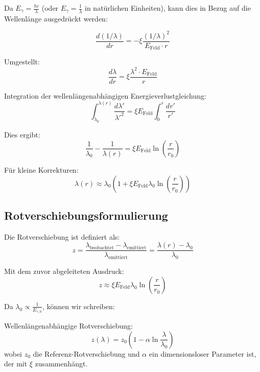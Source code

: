 \documentclass[12pt,a4paper]{article}
\newcommand{\efield}{E_{\text{Feld}}}
\theoremstyle{definition}
\begin{document}
	Da $E_\gamma = \frac{hc}{\lambda}$ (oder $E_\gamma = \frac{1}{\lambda}$ in natürlichen Einheiten), kann dies in Bezug auf die Wellenlänge ausgedrückt werden:
	
	\begin{equation}
		\frac{d(1/\lambda)}{dr} = -\xi \frac{(1/\lambda)^2}{\efield \cdot r}
	\end{equation}
	
	Umgestellt:
	\begin{equation}
		\frac{d\lambda}{dr} = \xi \frac{\lambda^2 \cdot \efield}{r}
	\end{equation}
	
	Integration der wellenlängenabhängigen Energieverlustgleichung:
	\begin{equation}
		\int_{\lambda_0}^{\lambda(r)} \frac{d\lambda'}{\lambda'^2} = \xi \efield \int_0^r \frac{dr'}{r'}
	\end{equation}
	
	Dies ergibt:
	\begin{equation}
		\frac{1}{\lambda_0} - \frac{1}{\lambda(r)} = \xi \efield \ln\left(\frac{r}{r_0}\right)
	\end{equation}
	
	Für kleine Korrekturen:
	\begin{equation}
		\lambda(r) \approx \lambda_0 \left(1 + \xi \efield \lambda_0 \ln\left(\frac{r}{r_0}\right)\right)
	\end{equation}
	
	\subsection{Rotverschiebungsformulierung}
	
	Die Rotverschiebung ist definiert als:
	\begin{equation}
		z = \frac{\lambda_{\text{beobachtet}} - \lambda_{\text{emittiert}}}{\lambda_{\text{emittiert}}} = \frac{\lambda(r) - \lambda_0}{\lambda_0}
	\end{equation}
	
	Mit dem zuvor abgeleiteten Ausdruck:
	\begin{equation}
		z \approx \xi \efield \lambda_0 \ln\left(\frac{r}{r_0}\right)
	\end{equation}
	
	Da $\lambda_0 \propto \frac{1}{E_{\gamma,0}}$, können wir schreiben:
	
	\begin{formel}
		Wellenlängenabhängige Rotverschiebung:
		\begin{equation}
			\boxed{z(\lambda) = z_0\left(1 - \alpha \ln\frac{\lambda}{\lambda_0}\right)}
		\end{equation}
		wobei $z_0$ die Referenz-Rotverschiebung und $\alpha$ ein dimensionsloser Parameter ist, der mit $\xi$ zusammenhängt.
	\end{formel}
	
\end{document}
